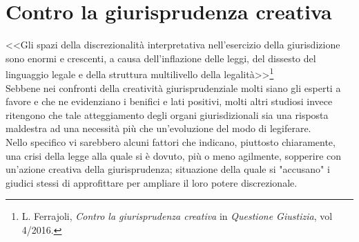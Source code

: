 \section{Contro la giurisprudenza creativa}%
<<Gli spazi della discrezionalità interpretativa nell’esercizio della giurisdizione sono enormi e crescenti, a causa dell’inflazione delle leggi, del dissesto del linguaggio legale e della struttura multilivello della legalità>>\footnote{L. Ferrajoli, \textit{Contro la giurisprudenza creativa} in \textit{Questione Giustizia}, vol 4/2016.}
\\Sebbene nei confronti della creatività giurisprudenziale molti siano gli esperti a favore e che ne evidenziano i benifici e lati positivi, molti altri studiosi invece ritengono che tale atteggiamento degli organi giurisdizionali sia una risposta maldestra ad una necessità più che un'evoluzione del modo di legiferare.
\\Nello specifico vi sarebbero alcuni fattori che indicano, piuttosto chiaramente, una crisi della legge alla quale si è dovuto, più o meno agilmente, sopperire con un'azione creativa della giurisprudenza; situazione della quale si "accusano" i giudici stessi di approfittare per ampliare il loro potere discrezionale.

